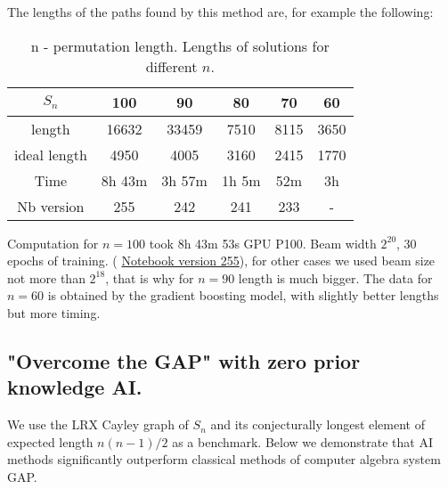 \documentclass[atmp]{ipart_v1}
\numberwithin{equation}{section}
\theoremstyle{plain}%
\begin{document}
The lengths of the paths found by this method are, for example the following:

\begin{table}[h]
  \centering
  \begin{tabular}{|c|c|c|c|c|c|}
  \hline
  $S_n$  & 100 & 90 & 80  & 70 & 60  \\
  \hline
  length  & 16632 & 33459  & 7510  & 8115 & 3650 \\
  \hline
  ideal length &  4950 & 4005  & 3160  & 2415 & 1770 \\
  \hline
  Time &  8h 43m & 3h 57m & 1h 5m  & 52m & 3h  \\
  \hline
  Nb version & 255 &  242 & 241  & 233  & - \\
  \hline
  \end{tabular}
  \captionsetup{skip=10pt} 
  \caption{n - permutation length. Lengths of solutions for different $n$. }
  \label{tab:example}
\end{table}

Computation for $n=100$ took 8h 43m 53s GPU P100. Beam width $ {2}^{20}$, 30 epochs of training. ( \href{https://www.kaggle.com/code/alexandervc/lrx-cayleypy-rl-mdqn?scriptVersionId=223954525}{Notebook version 255}), for other cases we used beam size not more than $ {2}^{18}$, that is why for $n=90$ length is much bigger. The data for $n=60$ is obtained by the gradient boosting model, with slightly better lengths but more timing.

\subsection{"Overcome the GAP" with zero prior knowledge AI. }

We use the LRX Cayley graph of $S_n$ and its conjecturally longest element of expected length $n(n-1)/2$ as a benchmark. Below we demonstrate that AI methods significantly outperform classical methods of computer algebra system GAP. 
\end{document}

